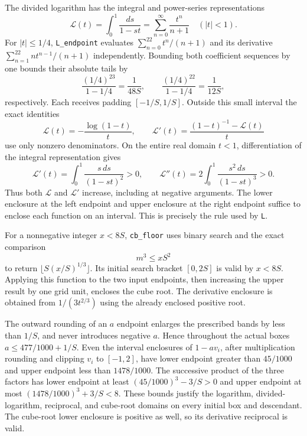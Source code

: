 The divided logarithm has the integral and power-series representations
\begin{equation}
 \mathcal L(t)=\int_0^1\frac{ds}{1-st}
             =\sum_{n=0}^{\infty}\frac{t^n}{n+1}
 \quad (|t|<1).
 \label{int:L-representation}
\end{equation}
For $|t|\le1/4$, \texttt{L\_endpoint} evaluates
$\sum_{n=0}^{22}t^n/(n+1)$ and its derivative
$\sum_{n=1}^{22}nt^{n-1}/(n+1)$ independently.  Bounding both
coefficient sequences by one bounds their absolute tails by
\begin{equation}
 \frac{(1/4)^{23}}{1-1/4}=\frac1{48S},\qquad
 \frac{(1/4)^{22}}{1-1/4}=\frac1{12S},
 \label{int:L-tails}
\end{equation}
respectively.  Each receives padding $[-1/S,1/S]$.  Outside this
small interval the exact identities
\[
 \mathcal L(t)=-\frac{\log(1-t)}t,\qquad
 \mathcal L'(t)=\frac{(1-t)^{-1}-\mathcal L(t)}t
\]
use only nonzero denominators.  On the entire real domain $t<1$,
differentiation of the integral representation gives
\[
 \mathcal L'(t)=\int_0^1\frac{s\,ds}{(1-st)^2}>0,\qquad
 \mathcal L''(t)=2\int_0^1\frac{s^2\,ds}{(1-st)^3}>0.
\]
Thus both $\mathcal L$ and $\mathcal L'$ increase, including at negative
arguments.  The lower enclosure at the left endpoint and upper
enclosure at the right endpoint suffice to enclose each function
on an interval.  This is precisely the rule used by \texttt{L}.

For a nonnegative integer $x<8S$, \texttt{cb\_floor} uses binary
search and the exact comparison
\[
 m^3\le xS^2
\]
to return $\lfloor S(x/S)^{1/3}\rfloor$.  Its initial search bracket
$[0,2S]$ is valid by $x<8S$.  Applying this function to the two input
endpoints, then increasing the upper result by one grid unit, encloses
the cube root.  The derivative enclosure is obtained from
$1/(3t^{2/3})$ using the already enclosed positive root.

The outward rounding of an $a$ endpoint enlarges the prescribed bands
by less than $1/S$, and never introduces negative $a$.  Hence throughout
the actual boxes $a\le477/1000+1/S$.  Even the interval enclosures of
$1-av_i$, after multiplication rounding and clipping $v_i$ to $[-1,2]$,
have lower endpoint greater than $45/1000$ and upper endpoint less
than $1478/1000$.  The successive product of the three factors has
lower endpoint at least $(45/1000)^3-3/S>0$ and upper endpoint at most
$(1478/1000)^3+3/S<8$.  These bounds justify the logarithm,
divided-logarithm, reciprocal, and cube-root domains on every initial
box and descendant.  The cube-root lower enclosure is positive as
well, so its derivative reciprocal is valid.

